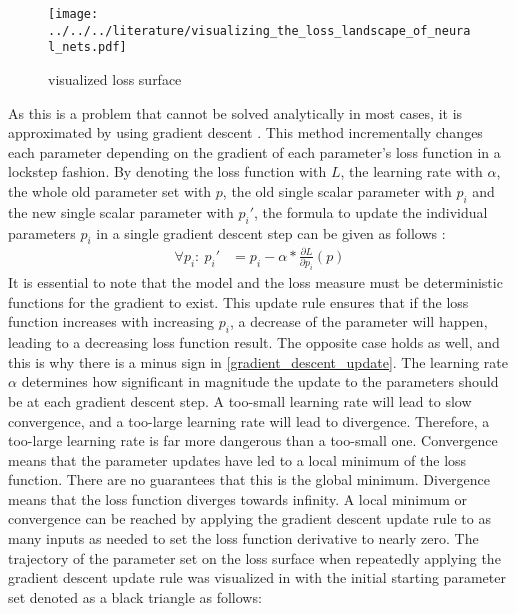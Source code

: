 \documentclass[draft,final]{vutinfth} %
\begin{document}
    \begin{figure}[H]
        \centering{}
        \texttt{[image: ../../../literature/visualizing\_the\_loss\_landscape\_of\_neural\_nets.pdf]}
        \caption{visualized loss surface \cite[p. 1]{loss_vis}}
        \label{fig:loss_vis}
    \end{figure}
    As this is a problem that cannot be solved analytically in most cases, it is approximated by using gradient descent \cite{GradientDescent}.
    This method incrementally changes each parameter depending on the gradient of each parameter's loss function in a lockstep fashion.
    By denoting the loss function with $L$, the learning rate with $\alpha$, the whole old parameter set with $p$, the old single scalar parameter with $p_i$ and the new single scalar parameter with $p_i'$, the formula to update the individual parameters $p_i$ in a single gradient descent step can be given as follows \cite{GradientDescent}:
    \begin{align} 
        \label{gradient_descent_update}
        \forall p_i:~p_i' &= p_i - \alpha * \frac{\partial{L}}{\partial{p_i}}(p)
    \end{align}
    It is essential to note that the model and the loss measure must be deterministic functions for the gradient to exist.
    This update rule ensures that if the loss function increases with increasing $p_i$, a decrease of the parameter will happen, leading to a decreasing loss function result.
    The opposite case holds as well, and this is why there is a minus sign in \ref{gradient_descent_update}.
    The learning rate $\alpha$ determines how significant in magnitude the update to the parameters should be at each gradient descent step.
    A too-small learning rate will lead to slow convergence, and a too-large learning rate will lead to divergence.
    Therefore, a too-large learning rate is far more dangerous than a too-small one.
    Convergence means that the parameter updates have led to a local minimum of the loss function.
    There are no guarantees that this is the global minimum. Divergence means that the loss function diverges towards infinity.
    A local minimum or convergence can be reached by applying the gradient descent update rule to as many inputs as needed to set the loss function derivative to nearly zero. 
    The trajectory of the parameter set on the loss surface when repeatedly applying the gradient descent update rule was visualized in \cite[p. 2]{gradient_descent_vis} with the initial starting parameter set denoted as a black triangle as follows:
\end{document}
